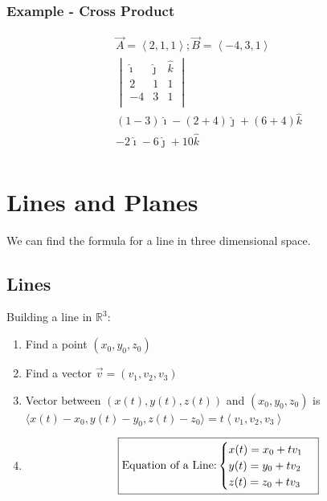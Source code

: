 \documentclass{article}
\newcommand{\nvec}[1]{\left\langle #1 \right\rangle}
\begin{document}
        \subsubsection{Example - Cross Product}
        \[
        \begin{aligned}
        \vec{A}=\nvec{2,1,1};\vec{B}=\nvec{-4,3,1}\\
        \begin{vmatrix}
        \hat{\imath} & \hat{\jmath} & \hat{k}\\
        2 & 1 & 1 \\
        -4 & 3 & 1\\
        \end{vmatrix}\\
        (1-3)\hat{\imath}-(2+4)\hat{\jmath}+(6+4)\hat{k}\\
        -2\hat{\imath}-6\hat{\jmath}+10\hat{k}\\
        \end{aligned}
        \]

\section{Lines and Planes}

    We can find the formula for a line in three dimensional space.\\

    \subsection{Lines}
    Building a line in $\mathbb{R}^3$:
    \begin{enumerate}
    \item Find a point $(x_0,y_0,z_0)$
    \item Find a vector $\vec{v}=(v_1,v_2,v_3)$
    \item Vector between $(x(t),y(t),z(t))$ and $(x_0,y_0,z_0)$ is $\langle x(t)-x_0,y(t)-y_0,z(t)-z_0\rangle = t\nvec{v_1,v_2,v_3}$
    \item \begin{equation}
    \boxed{\text{Equation of a Line:}\\
        \begin{cases}
            x(t)=x_0+tv_1\\
            y(t)=y_0+tv_2\\
            z(t)=z_0+tv_3
        \end{cases} }
    \end{equation}
    \end{enumerate}
\end{document}
